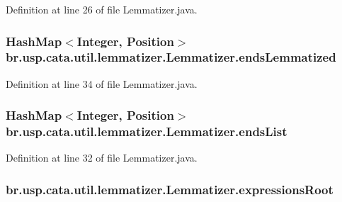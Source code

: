 Definition at line 26 of file Lemmatizer.\+java.

\hypertarget{classbr_1_1usp_1_1cata_1_1util_1_1lemmatizer_1_1_lemmatizer_a6970d634314b89b020bb62b16d66182f}{
\subsubsection[{ends\+Lemmatized}]{\setlength{\rightskip}{0pt plus 5cm}Hash\+Map$<$Integer, {\bf Position}$>$ br.\+usp.\+cata.\+util.\+lemmatizer.\+Lemmatizer.\+ends\+Lemmatized\hspace{0.3cm}{\ttfamily [private]}}}\label{classbr_1_1usp_1_1cata_1_1util_1_1lemmatizer_1_1_lemmatizer_a6970d634314b89b020bb62b16d66182f}


Definition at line 34 of file Lemmatizer.\+java.

\hypertarget{classbr_1_1usp_1_1cata_1_1util_1_1lemmatizer_1_1_lemmatizer_aa1c7ffc1a12b20366170487a64092d24}{
\subsubsection[{ends\+List}]{\setlength{\rightskip}{0pt plus 5cm}Hash\+Map$<$Integer, {\bf Position}$>$ br.\+usp.\+cata.\+util.\+lemmatizer.\+Lemmatizer.\+ends\+List\hspace{0.3cm}{\ttfamily [private]}}}\label{classbr_1_1usp_1_1cata_1_1util_1_1lemmatizer_1_1_lemmatizer_aa1c7ffc1a12b20366170487a64092d24}


Definition at line 32 of file Lemmatizer.\+java.

\hypertarget{classbr_1_1usp_1_1cata_1_1util_1_1lemmatizer_1_1_lemmatizer_a82f79714d4af8c2255637d47c961c960}{
\subsubsection[{expressions\+Root}]{ br.\+usp.\+cata.\+util.\+lemmatizer.\+Lemmatizer.\+expressions\+Root\hspace{0.3cm}{\ttfamily [private]}}}\label{classbr_1_1usp_1_1cata_1_1util_1_1lemmatizer_1_1_lemmatizer_a82f79714d4af8c2255637d47c961c960}


